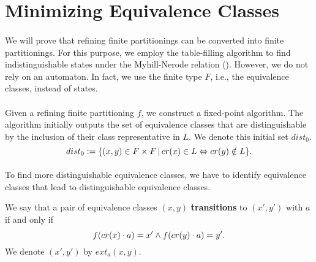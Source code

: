                             \section{Minimizing Equivalence Classes}

                            \paragraph{}
                            We will prove that refining finite partitionings can be converted into finite partitionings. 
                            For this purpose, we employ the table-filling algorithm to find indistinguishable states under the Myhill-Nerode relation (\cite{DBLP:books/daglib/0011126}).
                            However, we do not rely on an automaton. 
                            In fact, we use the finite type $F$, i.e., the equivalence classes, instead of states.

                            \paragraph{}
                            Given a refining finite partitioning $f$, we construct a fixed-point algorithm.
                            The algorithm initially outputs the set of equivalence classes that are distinguishable by the inclusion of their class representative in $L$. 
                            We denote this initial set $dist_0$.
                            \[
                                dist_0 := \{ (x,y)  \in F \times F \, | \, cr(x) \in L \Leftrightarrow cr(y) \notin L\}.
                                \]

                                \paragraph{}
                                To find more distinguishable equivalence classes, we have to identify equivalence classes that lead to distinguishable equivalence classes. 
                                \begin{definition}
                                    We say that a pair of equivalence classes $(x,y)$ \textbf{transitions} to $(x', y')$ with $a$ if and only if
                                    \[
                                        f (cr(x)\cdot a) = x' \wedge f (cr(y) \cdot a) = y'.
                                        \]
                                        We denote $(x', y')$ by $ext_a(x,y)$.
                                    \end{definition}

